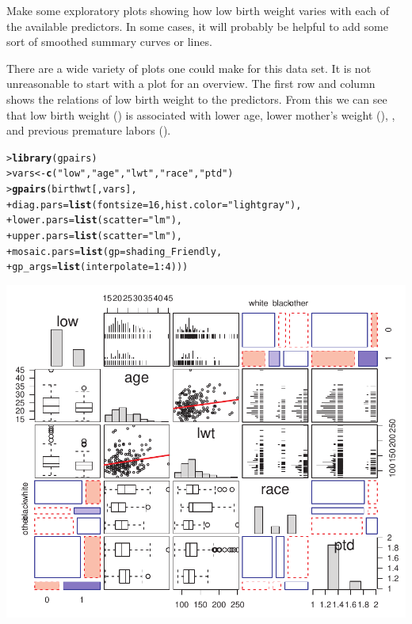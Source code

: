 \documentclass[10pt]{report}\usepackage[]{graphicx}\usepackage[]{color}
\makeatletter
\newcommand{\hlnum}[1]{\textcolor[rgb]{0.686,0.059,0.569}{#1}}%
\newcommand{\hlstr}[1]{\textcolor[rgb]{0.192,0.494,0.8}{#1}}%
\newcommand{\hlopt}[1]{\textcolor[rgb]{0,0,0}{#1}}%
\newcommand{\hlstd}[1]{\textcolor[rgb]{0.345,0.345,0.345}{#1}}%
\newcommand{\hlkwb}[1]{\textcolor[rgb]{0.69,0.353,0.396}{#1}}%
\newcommand{\hlkwc}[1]{\textcolor[rgb]{0.333,0.667,0.333}{#1}}%
\newcommand{\hlkwd}[1]{\textcolor[rgb]{0.737,0.353,0.396}{\textbf{#1}}}%
\newenvironment{kframe}{%
 \def\at@end@of@kframe{}%
 \ifinner\ifhmode%
  \def\at@end@of@kframe{\end{minipage}}%
  \begin{minipage}{\columnwidth}%
 \fi\fi%
 \def\FrameCommand##1{\hskip\@totalleftmargin \hskip-\fboxsep
 \colorbox{shadecolor}{##1}\hskip-\fboxsep
     \hskip-\linewidth \hskip-\@totalleftmargin \hskip\columnwidth}%
 \MakeFramed {\advance\hsize-\width
   \@totalleftmargin\z@ \linewidth\hsize
   \@setminipage}}%
 {\par\unskip\endMakeFramed%
 \at@end@of@kframe}
\newenvironment{knitrout}{}{} %
\renewenvironment{knitrout}{\small\renewcommand{\baselinestretch}{.85}}{} %
\makeatother
\begin{document}
\begin{Exercises}
\begin{enumerate*}
    \item Make some exploratory plots showing how low birth weight varies with each of the available predictors.  
    In some cases, it will probably be helpful to add some sort of smoothed summary curves or lines.
    \begin{ans}
    There are a wide variety of plots one could make for this data set.  It is not unreasonable to start with a 
    plot for an overview. The first row and column shows the relations of low birth weight to the predictors.
    From this we can see that low birth weight () is associated with lower age, lower mother's weight
    (), , and previous premature labors ().
\begin{knitrout}\footnotesize
{}\color{fgcolor}\begin{kframe}
\begin{alltt}
\hlstd{> }\hlkwd{library}\hlstd{(gpairs)}
\hlstd{> }\hlstd{vars} \hlkwb{<-} \hlkwd{c}\hlstd{(}\hlstr{"low"}\hlstd{,} \hlstr{"age"}\hlstd{,} \hlstr{"lwt"}\hlstd{,} \hlstr{"race"}\hlstd{,} \hlstr{"ptd"}\hlstd{)}
\hlstd{> }\hlkwd{gpairs}\hlstd{(birthwt[,vars],}
\hlstd{+ }  \hlkwc{diag.pars}\hlstd{=}\hlkwd{list}\hlstd{(}\hlkwc{fontsize}\hlstd{=}\hlnum{16}\hlstd{,} \hlkwc{hist.color}\hlstd{=}\hlstr{"lightgray"}\hlstd{),}
\hlstd{+ }  \hlkwc{lower.pars} \hlstd{=} \hlkwd{list}\hlstd{(}\hlkwc{scatter}\hlstd{=}\hlstr{"lm"}\hlstd{),}
\hlstd{+ }  \hlkwc{upper.pars} \hlstd{=} \hlkwd{list}\hlstd{(}\hlkwc{scatter}\hlstd{=}\hlstr{"lm"}\hlstd{),}
\hlstd{+ }  \hlkwc{mosaic.pars}\hlstd{=}\hlkwd{list}\hlstd{(}\hlkwc{gp}\hlstd{=shading_Friendly,}
\hlstd{+ }                   \hlkwc{gp_args}\hlstd{=}\hlkwd{list}\hlstd{(}\hlkwc{interpolate}\hlstd{=}\hlnum{1}\hlopt{:}\hlnum{4}\hlstd{)))}
\end{alltt}
\end{kframe}

\centerline{\includegraphics[width=.6\textwidth]{soln/fig/ex7_6a1-1} }




\end{knitrout}
\end{ans}
\end{enumerate*}
\end{Exercises}
\end{document}
